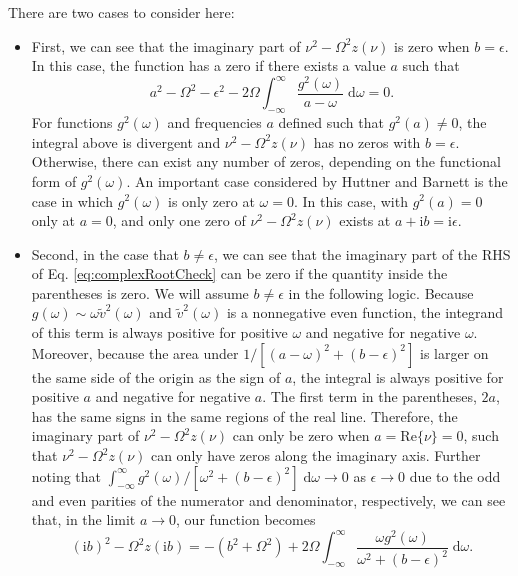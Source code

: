 There are two cases to consider here:
\begin{itemize}
    \item{
    First, we can see that the imaginary part of $\nu^2 - \Omega^2z(\nu)$ is zero when $b = \epsilon$. In this case, the function has a zero if there exists a value $a$ such that
    \begin{equation}
    a^2 - \Omega^2 - \epsilon^2 - 2\Omega\int_{-\infty}^\infty\frac{g^2(\omega)}{a - \omega}\;\mathrm{d}\omega = 0.
    \end{equation}
    For functions $g^2(\omega)$ and frequencies $a$ defined such that $g^2(a)\neq0$, the integral above is divergent and $\nu^2 - \Omega^2z(\nu)$ has no zeros with $b = \epsilon$. Otherwise, there can exist any number of zeros, depending on the functional form of $g^2(\omega)$. An important case considered by Huttner and Barnett\cite{huttner1992quantization} is the case in which $g^2(\omega)$ is only zero at $\omega = 0$. In this case, with $g^2(a) = 0$ only at $a = 0$, and only one zero of $\nu^2 - \Omega^2z(\nu)$ exists at $a + \mathrm{i}b = \mathrm{i}\epsilon$.
    }
    \item{
    Second, in the case that $b\neq\epsilon$, we can see that the imaginary part of the RHS of Eq. \eqref{eq:complexRootCheck} can be zero if the quantity inside the parentheses is zero. We will assume $b\neq\epsilon$ in the following logic. Because $g(\omega)\sim\omega\tilde{v}^2(\omega)$ and $\tilde{v}^2(\omega)$ is a nonnegative even function, the integrand of this term is always positive for positive $\omega$ and negative for negative $\omega$. Moreover, because the area under $1/[(a - \omega)^2 + (b - \epsilon)^2]$ is larger on the same side of the origin as the sign of $a$, the integral is always positive for positive $a$ and negative for negative $a$. The first term in the parentheses, $2a$, has the same signs in the same regions of the real line. Therefore, the imaginary part of $\nu^2 - \Omega^2z(\nu)$ can only be zero when $a = \mathrm{Re}\{\nu\} = 0$, such that $\nu^2 - \Omega^2z(\nu)$ can only have zeros along the imaginary axis. Further noting that $\int_{-\infty}^\infty g^2(\omega)/[\omega^2 + (b - \epsilon)^2]\;\mathrm{d}\omega \to 0$ as $\epsilon\to0$ due to the odd and even parities of the numerator and denominator, respectively, we can see that, in the limit $a\to0$, our function becomes
    \begin{equation}
    (\mathrm{i}b)^2 - \Omega^2z(\mathrm{i}b) = -(b^2 + \Omega^2) + 2\Omega\int_{-\infty}^\infty \frac{\omega g^2(\omega)}{\omega^2 + (b - \epsilon)^2}\;\mathrm{d}\omega.

\end{equation}}
\end{itemize}
